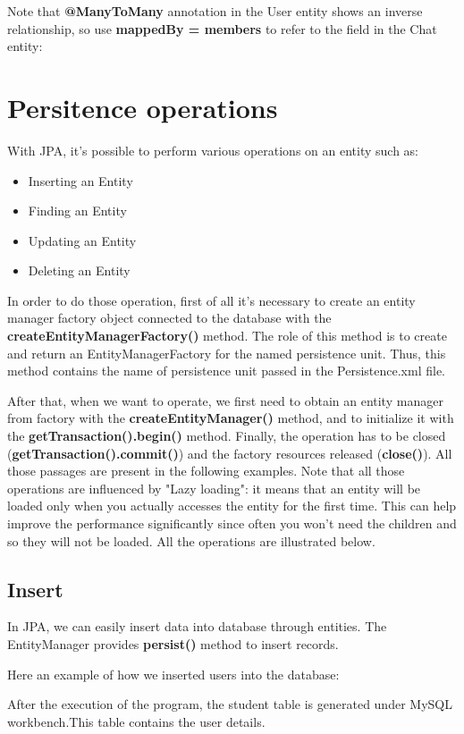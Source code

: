 \documentclass[a4paper]{article}
\begin{document}
Note that \textbf{@ManyToMany} annotation in the User entity shows an inverse relationship, so use \textbf{mappedBy = members} to refer to the field in the Chat entity:


\section{Persitence operations}
With JPA, it's possible to perform various operations on an entity such as:

\begin{itemize}
\item{Inserting an Entity}
\item{Finding an Entity}
\item{Updating an Entity}
\item{Deleting an Entity}
\end{itemize}

In order to do those operation, first of all it's necessary to create an entity manager factory object connected to the database with the \textbf{createEntityManagerFactory()} method. The role of this method is to create and return an EntityManagerFactory for the named persistence unit. Thus, this method contains the name of persistence unit passed in the Persistence.xml file.

After that, when we want to operate, we first need to obtain an entity manager from factory with the \textbf{createEntityManager()} method, and to initialize it with the \textbf{getTransaction().begin()} method. Finally, the operation has to be closed (\textbf{getTransaction().commit()}) and the factory resources released (\textbf{close()}).
All those passages are present in the following examples.
Note that all those operations are influenced by "Lazy loading": it means that an entity will be loaded only when you actually accesses the entity for the first time. This can help improve the performance significantly since often you won't need the children and so they will not be loaded.
All the operations are illustrated below.

\subsection{Insert}
In JPA, we can easily insert data into database through entities. The EntityManager provides \textbf{persist()} method to insert records.

Here an example of how we inserted users into the database:

After the execution of the program, the student table is generated under MySQL workbench.This table contains the user details.
\end{document}
